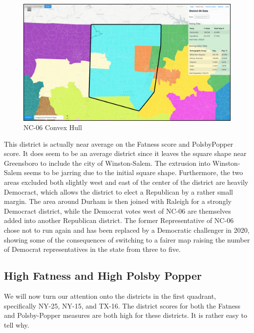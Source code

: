 \documentclass[letterpaper]{article}
\begin{document}
\begin{figure}[H]
	\includegraphics[width=\linewidth]{./figures/NC-06-ConvexHull.png}
	\caption{NC-06 Convex Hull}
	\label{fig:nc06convexHull}
\end{figure}

This district is actually near average on the Fatness score and PolsbyPopper score. It does seem to be an average district since it leaves the square shape near Greensboro to include the city of Winston-Salem. The extrusion into Winston-Salem seems to be jarring due to the initial square shape. Furthermore, the two areas excluded both slightly west and east of the center of the district are heavily Democract, which allows the district to elect a Republican by a rather small margin. The area around Durham is then joined with Raleigh for a strongly Democract district, while the Democrat votes west of NC-06 are themselves added into another Republican district. The former Representative of NC-06 chose not to run again and has been replaced by a Democratic challenger in 2020, showing some of the consequences of switching to a fairer map raising the number of Democrat representatives in the state from three to five.

\subsection{High Fatness and High Polsby Popper}
We will now turn our attention onto the districts in the first quadrant, specifically NY-25, NY-15, and TX-16. The district scores for both the Fatness and Polsby-Popper measures are both high for these districts. It is rather easy to tell why.
\end{document}
